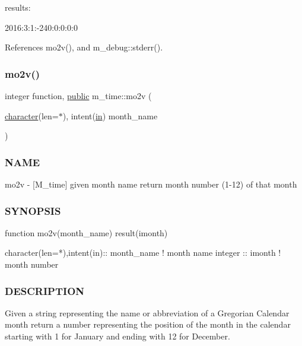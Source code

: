 \begin{DoxyVerb}
\begin{DoxyVerb}
results:

   2016:3:1:-240:0:0:0:0 \end{DoxyVerb}
 

References mo2v(), and m\+\_\+debug\+::stderr().

\mbox{\label{namespacem__time_ad7bf0886754757e8961e562f06cf3bb7}} 
\subsubsection{\texorpdfstring{mo2v()}{mo2v()}}
{\footnotesize\ttfamily integer function, \hyperlink{M__stopwatch_83_8txt_a2f74811300c361e53b430611a7d1769f}{public} m\+\_\+time\+::mo2v (\begin{DoxyParamCaption}\item[{\hyperlink{option__stopwatch_83_8txt_abd4b21fbbd175834027b5224bfe97e66}{character}(len=$\ast$), intent(\hyperlink{M__journal_83_8txt_afce72651d1eed785a2132bee863b2f38}{in})}]{month\+\_\+name }\end{DoxyParamCaption})}



\subsubsection*{N\+A\+ME}

mo2v -\/ \mbox{[}M\+\_\+time\mbox{]} given month name return month number (1-\/12) of that month 

\subsubsection*{S\+Y\+N\+O\+P\+S\+IS}

\begin{DoxyVerb}function mo2v(month_name) result(imonth)

  character(len=*),intent(in):: month_name ! month name
  integer                    :: imonth     ! month number
\end{DoxyVerb}


\subsubsection*{D\+E\+S\+C\+R\+I\+P\+T\+I\+ON}

Given a string representing the name or abbreviation of a Gregorian Calendar month return a number representing the position of the month in the calendar starting with 1 for January and ending with 12 for December.


\end{DoxyVerb}
